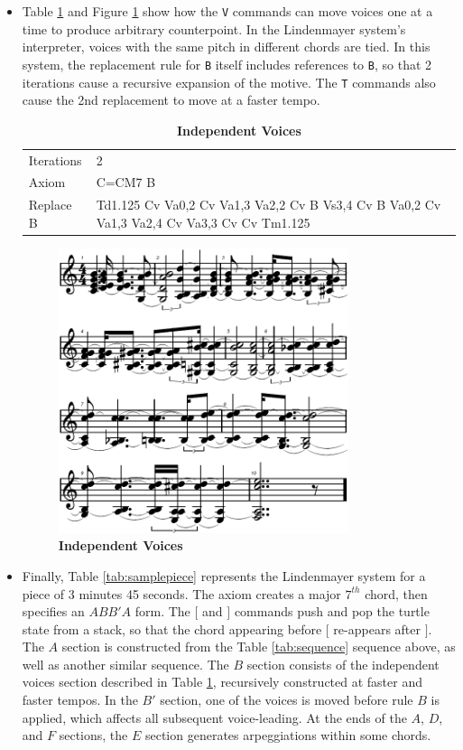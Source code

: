 \documentclass[14pt,letterpaper,onecolumn]{scrartcl}
\begin{document}
\begin{itemize}
\item Table \ref{tab:vcommands} and Figure \ref{fig:vcommands} show how the \texttt{V} commands can move voices one at a time to produce arbitrary counterpoint. In the Lindenmayer system's interpreter, voices with the same pitch in different chords are tied. In this system, the replacement rule for \texttt{B} itself includes references to \texttt{B}, so that 2 iterations cause a recursive expansion of the motive. The \texttt{T} commands also cause the 2nd replacement to move at a faster tempo.

\begin{table}[tbp]
\begin{tabular}{l|p{12cm}}
\hline
Iterations & 2\\
Axiom & \ttfamily C=CM7 B \\
Replace \ttfamily B & \ttfamily Td1.125 Cv Va0,2 Cv Va1,3 Va2,2 Cv B Vs3,4 Cv B Va0,2 Cv Va1,3 Va2,4 Cv Va3,3 Cv Cv Tm1.125\\
\hline
\end{tabular}
\caption{\textbf{Independent Voices}}
\label{tab:vcommands}
\end{table}

\begin{figure}[htbp]
	\centering
		\includegraphics[width=8.5cm]{vcommands}
	\caption{\textbf{Independent Voices}}
	\label{fig:vcommands}
\end{figure}

\newpage

\item Finally, Table \ref{tab:samplepiece} represents the Lindenmayer system for a piece of 3 minutes 45 seconds. The axiom creates a major $7^{th}$ chord, then specifies an $A B B' A$ form. The $[$ and $]$ commands push and pop the turtle state from a stack, so that the chord appearing before $[$ re-appears after $]$. The $A$ section is constructed from the Table \ref{tab:sequence} sequence above, as well as another similar sequence. The $B$ section consists of the independent voices section described in Table \ref{tab:vcommands}, recursively constructed at faster and faster tempos. In the $B'$ section, one of the voices is moved before rule $B$ is applied, which affects all subsequent voice-leading. At the ends of the $A$, $D$, and $F$ sections, the $E$ section generates arpeggiations within some chords. 


\end{itemize}
\end{document}
